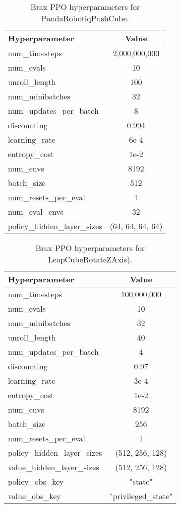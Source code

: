 \begin{table}[ht]
\centering
\begin{tabular}{|l|c|} 
\hline
\textbf{Hyperparameter} & \textbf{Value} \\ \hline
num\_timesteps & 2,000,000,000 \\ \hline
num\_evals & 10 \\ \hline
unroll\_length & 100 \\ \hline
num\_minibatches & 32 \\ \hline
num\_updates\_per\_batch & 8 \\ \hline
discounting & 0.994 \\ \hline
learning\_rate & 6e-4 \\ \hline
entropy\_cost & 1e-2 \\ \hline
num\_envs & 8192 \\ \hline
batch\_size & 512 \\ \hline
num\_resets\_per\_eval & 1 \\ \hline
num\_eval\_envs & 32 \\ \hline
policy\_hidden\_layer\_sizes & (64, 64, 64, 64) \\ \hline 
\end{tabular}
\caption{Brax PPO hyperparameters for PandaRobotiqPushCube.}
\end{table}

\begin{table}[ht]
\centering
\begin{tabular}{|l|c|} 
\hline
\textbf{Hyperparameter} & \textbf{Value} \\ \hline
num\_timesteps & 100,000,000 \\ \hline
num\_evals & 10 \\ \hline
num\_minibatches & 32 \\ \hline
unroll\_length & 40 \\ \hline
num\_updates\_per\_batch & 4 \\ \hline
discounting & 0.97 \\ \hline
learning\_rate & 3e-4 \\ \hline
entropy\_cost & 1e-2 \\ \hline
num\_envs & 8192 \\ \hline
batch\_size & 256 \\ \hline
num\_resets\_per\_eval & 1 \\ \hline
policy\_hidden\_layer\_sizes & (512, 256, 128) \\ \hline 
value\_hidden\_layer\_sizes & (512, 256, 128) \\ \hline 
policy\_obs\_key & "state" \\ \hline
value\_obs\_key & "privileged\_state" \\ \hline
\end{tabular}
\caption{Brax PPO hyperparameters for LeapCubeRotateZAxis).}
\end{table}

